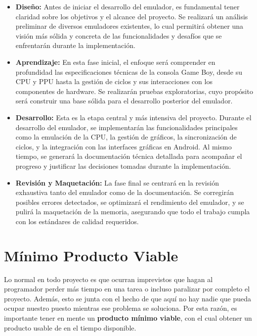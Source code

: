 \begin{itemize}
	\item \textbf{Diseño:} Antes de iniciar el desarrollo del emulador, es fundamental tener claridad sobre los objetivos y el alcance del proyecto. Se realizará un análisis preliminar de diversos emuladores existentes, lo cual permitirá obtener una visión más sólida y concreta de las funcionalidades y desafíos que se enfrentarán durante la implementación.

	\item \textbf{Aprendizaje:} En esta fase inicial, el enfoque será comprender en profundidad las especificaciones técnicas de la consola Game Boy, desde su CPU y PPU hasta la gestión de ciclos y sus interacciones con los componentes de hardware. Se realizarán pruebas exploratorias, cuyo propósito será construir una base sólida para el desarrollo posterior del emulador.
	
	\item \textbf{Desarrollo:} Esta es la etapa central y más intensiva del proyecto. Durante el desarrollo del emulador, se implementarán las funcionalidades principales como la emulación de la CPU, la gestión de gráficos, la sincronización de ciclos, y la integración con las interfaces gráficas en Android. Al mismo tiempo, se generará la documentación técnica detallada para acompañar el progreso y justificar las decisiones tomadas durante la implementación.
	
	\item \textbf{Revisión y Maquetación:} La fase final se centrará en la revisión exhaustiva tanto del emulador como de la documentación. Se corregirán posibles errores detectados, se optimizará el rendimiento del emulador, y se pulirá la maquetación de la memoria, asegurando que todo el trabajo cumpla con los estándares de calidad requeridos.
	
\end{itemize}
	
\section{Mínimo Producto Viable}

Lo normal en todo proyecto es que ocurran imprevistos que hagan al programador perder más tiempo en una tarea o incluso paralizar por completo el proyecto. Además, esto se junta con el hecho de que aquí no hay nadie que pueda ocupar nuestro puesto mientras ese problema se soluciona. Por esta razón, es importante tener en mente un \textbf{producto mínimo viable}, con el cual obtener un producto usable de en el tiempo disponible.

